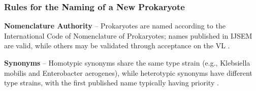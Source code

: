 \begin{table}[h]
    \centering
    \caption{Prokaryotic taxonomic categories have validated names written in cursive (ICNP). New classes follow the genus (ICNP rule 8) }
    \label{tab:L3-TaxnRules}
    \end{table}
\subsubsection{Rules for the Naming of a New Prokaryote}

\textbf{Nomenclature Authority} – Prokaryotes are named according to the International Code of Nomenclature of Prokaryotes; names published in IJSEM are valid, while others may be validated through acceptance on the VL \cite*{L3-SeqBasedClass}.
    
\textbf{Synonyms} – Homotypic synonyms share the same type strain (e.g., Klebsiella mobilis and Enterobacter aerogenes), while heterotypic synonyms have different type strains, with the first published name typically having priority \cite*{L3-SeqBasedClass}.
    
